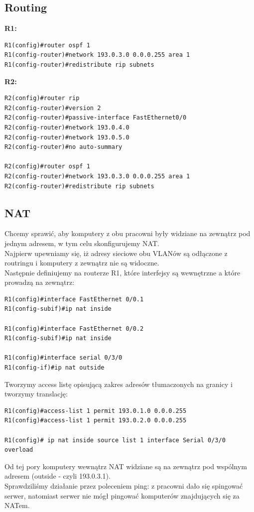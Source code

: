 \documentclass[11pt,a4paper]{article}
\begin{document}
\subsection{Routing}
{\bf R1:}\\
\begin{lstlisting}
R1(config)#router ospf 1
R1(config-router)#network 193.0.3.0 0.0.0.255 area 1
R1(config-router)#redistribute rip subnets 
 \end{lstlisting}
{\bf R2:}\\
\begin{lstlisting}
R2(config)#router rip
R2(config-router)#version 2
R2(config-router)#passive-interface FastEthernet0/0
R2(config-router)#network 193.0.4.0
R2(config-router)#network 193.0.5.0
R2(config-router)#no auto-summary

R2(config)#router ospf 1
R2(config-router)#network 193.0.3.0 0.0.0.255 area 1
R2(config-router)#redistribute rip subnets 
 \end{lstlisting}
\subsection{NAT}

Chcemy sprawić, aby komputery z obu pracowni były widziane na zewnątrz pod jednym adresem, w tym celu skonfigurujemy NAT.\\
Najpierw upewniamy się, iż adresy sieciowe obu VLANów są odłączone z routringu i komputery z zewnątrz nie są widoczne.\\
Następnie definiujemy na routerze R1, które interfejsy są wewnętrzne a które prowadzą na zewnątrz:
\begin{lstlisting}
R1(config)#interface FastEthernet 0/0.1
R1(config-subif)#ip nat inside

R1(config)#interface FastEthernet 0/0.2
R1(config-subif)#ip nat inside

R1(config)#interface serial 0/3/0
R1(config-if)#ip nat outside
\end{lstlisting}
Tworzymy access listę opisującą zakres adresów tłumaczonych na granicy i tworzymy translację:
\begin{lstlisting}
R1(config)#access-list 1 permit 193.0.1.0 0.0.0.255
R1(config)#access-list 1 permit 193.0.2.0 0.0.0.255

R1(config)# ip nat inside source list 1 interface Serial 0/3/0 overload
\end{lstlisting}
Od tej pory komputery wewnątrz NAT widziane są na zewnątrz pod wspólnym adresem (outside - czyli 193.0.3.1).\\
Sprawdziliśmy działanie przez poleceniem ping: z pracowni dało się spingować serwer, natomiast serwer nie mógł pingować komputerów znajdujących się za NATem.
 
\end{document}

